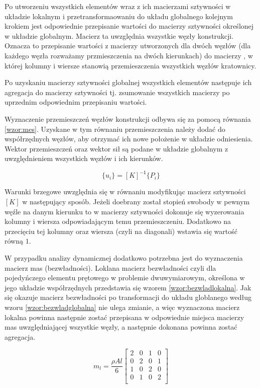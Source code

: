 \documentclass[12pt, a4papper, twoside]{article}
\begin{document}
Po utworzeniu wszystkich elementów wraz z ich macierzami sztywności w układzie lokalnym i przetransformaowaniu do układu globalnego kolejnym krokiem jest odpowiednie przepisanie wartości do macierzy sztywności określonej w układzie globalnym. Macierz ta uwzględnia wszystkie węzły konstrukcji. Oznacza to przepisanie wartości z macierzy utworzonych dla dwóch węzłów (dla każdego węzła rozważamy przmieszczenia na dwóch kierunkach) do macierzy , w której kolumny i wiersze stanowią przemieszczenia wszystkich węzłów kratownicy. 

Po uzyskaniu macierzy sztywności globalnej wszystkich elementów następuje ich agregacja do macierzy sztywności tj. zsumowanie wszystkich macierzy po uprzednim odpowiednim przepisaniu wartości.

Wyznaczenie przemieszczeń węzłów konstrukcji odbywa się za pomocą równania \ref{wzor:mes}. Uzyskane w tym równaniu przemieszczenia należy dodać do współrzędnych węzłów, aby otrzymać ich nowe położenie w układzie odniesienia. Wektor przemieszczeń oraz wektor sił są podane w układzie globalnym z uwzględnieniem wszystkich węzłów i ich kierunków.


\begin{equation}
  \{u_{i}\} = [K]^\mathsf{-1}\{P_{i}\}
    \label{wzor:mes}
\end{equation}

Warunki brzegowe uwzględnia się w równaniu modyfikując macierz sztywności $[K]$ w następujący sposób. Jeżeli doebrany został stopień swobody w pewnym węźle na danym kierunku to w macierzy sztywności dokonuje się wyzerowania kolumny i wiersza odpowiadającym temu przemieszczeniu. Dodatkowo na przecięciu tej kolumny oraz wiersza (czyli na diagonali) wstawia się wartość równą $1$.

W przypadku analizy dynamicznej dodatkowo potrzebna jest do wyznaczenia macierz mas (bezwładności). Loklana macierz bezwładności czyli dla pojedyńczego elementu prętowego w problemie dwuwymiarowym, określona w jego układzie współrzędnych przedstawia się wzorem \ref{wzor:bezwladlokalna}. Jak się okazuje macierz bezwładności po transformacji do układu globlanego według wzoru \ref{wzor:bezwladglobalna} nie ulega zmianie, a więc wyznaczona macierz lokalna powinna następnie zostać przepisana w odpowiednie miejsca macierzy mas uwzględniającej wszystkie węzły, a następnie dokonana powinna zostać agregacja.

\begin{equation}
   m_{l} = \frac{\rho Al}{6} \begin{bmatrix}
    2       & 0 & 1 &  0 \\
    0       & 2 & 0 &  1 \\
    1       & 0 & 2 &  0 \\
    0      & 1 & 0 &  2 \\
\end{bmatrix}
    \label{wzor:bezwladlokalna}
\end{equation}
\end{document}
